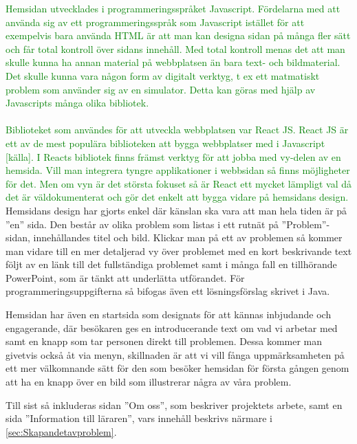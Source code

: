 \textcolor{green}{Hemsidan utvecklades i programmeringsspråket Javascript. Fördelarna med att använda sig av ett programmeringsspråk som Javascript istället för att exempelvis bara använda HTML är att man kan designa sidan på många fler sätt och får total kontroll över sidans innehåll. Med total kontroll menas det att man skulle kunna ha annan material på webbplatsen än bara text- och bildmaterial. Det skulle kunna vara någon form av digitalt verktyg, t ex ett matmatiskt problem som använder sig av en simulator. Detta kan göras med hjälp av Javascripts många olika bibliotek.}
\\ \\
\textcolor{green}{Biblioteket som användes för att utveckla webbplatsen var React JS. React JS är ett av de mest populära biblioteken att bygga webbplatser med i Javascript [källa]. I Reacts bibliotek finns främst verktyg för att jobba med vy-delen av en hemsida. Vill man integrera tyngre applikationer i webbsidan så finns möjligheter för det. Men om vyn är det största fokuset så är React ett mycket lämpligt val då det är väldokumenterat och gör det enkelt att bygga vidare på hemsidans design.}
\\

\textcolor{Mahogany}{Hemsidans design har gjorts enkel där känslan ska vara att man hela tiden är på ''en'' sida. Den består av olika problem som listas i ett rutnät på ''Problem''-sidan, innehållandes titel och bild. Klickar man på ett av problemen så kommer man vidare till en mer detaljerad vy över problemet med en kort beskrivande text följt av en länk till det fullständiga problemet samt i många fall en tillhörande PowerPoint, som är tänkt att underlätta utförandet. För programmeringsuppgifterna så bifogas även ett lösningsförslag skrivet i Java.}

\textcolor{Mahogany}{Hemsidan har även en startsida som designats för att kännas inbjudande och engagerande, där besökaren ges en introducerande text om vad vi arbetar med samt en knapp som tar personen direkt till problemen. Dessa kommer man givetvis också åt via menyn, skillnaden är att vi vill fånga uppmärksamheten på ett mer välkomnande sätt för den som besöker hemsidan för första gången genom att ha en knapp över en bild som illustrerar några av våra problem.}

\textcolor{Mahogany}{Till sist så inkluderas sidan ''Om oss'', som beskriver projektets arbete, samt en sida ''Information till läraren'', vars innehåll beskrivs närmare i \ref{sec:Skapandetavproblem}.}